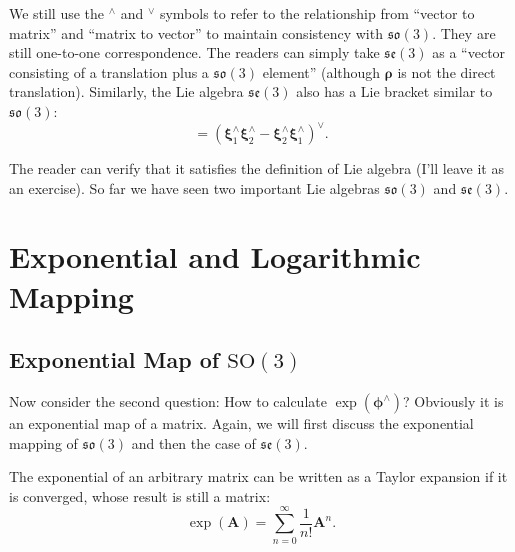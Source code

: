 We still use the $^\wedge$ and $^\vee$ symbols to refer to the relationship from ``vector to matrix'' and ``matrix to vector'' to maintain consistency with $\mathfrak{so}(3)$. They are still one-to-one correspondence. The readers can simply take $\mathfrak{se}(3)$ as a ``vector consisting of a translation plus a $\mathfrak{so}(3)$ element'' (although $\boldsymbol{\rho} $ is not the direct translation). Similarly, the Lie algebra $\mathfrak{se}(3)$ also has a Lie bracket similar to $\mathfrak{so}(3)$:
\begin{equation}
[ \boldsymbol{\xi}_1, \boldsymbol{\xi}_2 ] = \left( \boldsymbol{\xi}_1^\wedge \boldsymbol{\xi}_2^\wedge -\boldsymbol{\xi}_2^ \wedge \boldsymbol{\xi}_1^\wedge \right) ^\vee.
\end{equation}

The reader can verify that it satisfies the definition of Lie algebra (I'll leave it as an exercise). So far we have seen two important Lie algebras $\mathfrak{so}(3)$ and $\mathfrak{se}(3)$.

\section{Exponential and Logarithmic Mapping}
\subsection{Exponential Map of $\mathrm{SO}(3)$}

Now consider the second question: How to calculate $\exp ( \boldsymbol{\phi}^{\wedge} )$? Obviously it is an exponential map of a matrix. Again, we will first discuss the exponential mapping of $\mathfrak{so}(3)$ and then the case of $\mathfrak{se}(3)$.

The exponential of an arbitrary matrix can be written as a Taylor expansion if it is converged, whose result is still a matrix:
\begin{equation}
\exp(\mathbf{A}) = \sum\limits_{n = 0}^\infty {\frac{1}{{n!}}{ \mathbf{A}^n}}.
\end{equation}


